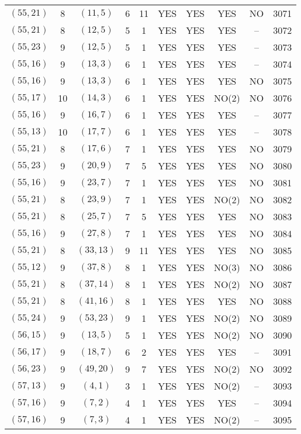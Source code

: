 \begin{longtable}{|c|c|c|c|c|c|c|c|c|c|}
$(55, 21)$ & 8 & $(11, 5)$ & 6 & 11 & YES & YES & YES & NO & 3071\\
$(55, 21)$ & 8 & $(12, 5)$ & 5 & 1 & YES & YES & YES & -- & 3072\\
$(55, 23)$ & 9 & $(12, 5)$ & 5 & 1 & YES & YES & YES & -- & 3073\\
$(55, 16)$ & 9 & $(13, 3)$ & 6 & 1 & YES & YES & YES & -- & 3074\\
$(55, 16)$ & 9 & $(13, 3)$ & 6 & 1 & YES & YES & YES & NO & 3075\\
$(55, 17)$ & 10 & $(14, 3)$ & 6 & 1 & YES & YES & NO(2) & NO & 3076\\
$(55, 16)$ & 9 & $(16, 7)$ & 6 & 1 & YES & YES & YES & -- & 3077\\
$(55, 13)$ & 10 & $(17, 7)$ & 6 & 1 & YES & YES & YES & -- & 3078\\
$(55, 21)$ & 8 & $(17, 6)$ & 7 & 1 & YES & YES & YES & NO & 3079\\
$(55, 23)$ & 9 & $(20, 9)$ & 7 & 5 & YES & YES & YES & NO & 3080\\
$(55, 16)$ & 9 & $(23, 7)$ & 7 & 1 & YES & YES & YES & NO & 3081\\
$(55, 21)$ & 8 & $(23, 9)$ & 7 & 1 & YES & YES & NO(2) & NO & 3082\\
$(55, 21)$ & 8 & $(25, 7)$ & 7 & 5 & YES & YES & YES & NO & 3083\\
$(55, 16)$ & 9 & $(27, 8)$ & 7 & 1 & YES & YES & YES & NO & 3084\\
$(55, 21)$ & 8 & $(33, 13)$ & 9 & 11 & YES & YES & YES & NO & 3085\\
$(55, 12)$ & 9 & $(37, 8)$ & 8 & 1 & YES & YES & NO(3) & NO & 3086\\
$(55, 21)$ & 8 & $(37, 14)$ & 8 & 1 & YES & YES & NO(2) & NO & 3087\\
$(55, 21)$ & 8 & $(41, 16)$ & 8 & 1 & YES & YES & YES & NO & 3088\\
$(55, 24)$ & 9 & $(53, 23)$ & 9 & 1 & YES & YES & NO(2) & NO & 3089\\
$(56, 15)$ & 9 & $(13, 5)$ & 5 & 1 & YES & YES & NO(2) & NO & 3090\\
$(56, 17)$ & 9 & $(18, 7)$ & 6 & 2 & YES & YES & YES & -- & 3091\\
$(56, 23)$ & 9 & $(49, 20)$ & 9 & 7 & YES & YES & NO(2) & NO & 3092\\
$(57, 13)$ & 9 & $(4, 1)$ & 3 & 1 & YES & YES & NO(2) & -- & 3093\\
$(57, 16)$ & 9 & $(7, 2)$ & 4 & 1 & YES & YES & YES & -- & 3094\\
$(57, 16)$ & 9 & $(7, 3)$ & 4 & 1 & YES & YES & NO(2) & -- & 3095\\

\end{longtable}

